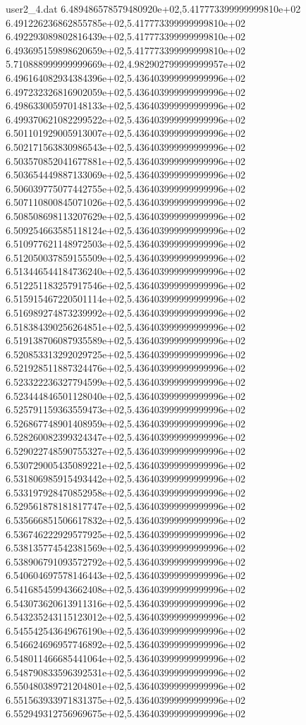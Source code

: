 \begin{filecontents}{user2_4.dat}
6.489486578579480920e+02,5.417773399999999810e+02
6.491226236862855785e+02,5.417773399999999810e+02
6.492293089802816439e+02,5.417773399999999810e+02
6.493695159898620659e+02,5.417773399999999810e+02
5.710888999999999669e+02,4.982902799999999957e+02
6.496164082934384396e+02,5.436403999999999996e+02
6.497232326816902059e+02,5.436403999999999996e+02
6.498633005970148133e+02,5.436403999999999996e+02
6.499370621082299522e+02,5.436403999999999996e+02
6.501101929005913007e+02,5.436403999999999996e+02
6.502171563830986543e+02,5.436403999999999996e+02
6.503570852041677881e+02,5.436403999999999996e+02
6.503654449887133069e+02,5.436403999999999996e+02
6.506039775077442755e+02,5.436403999999999996e+02
6.507110800845071026e+02,5.436403999999999996e+02
6.508508698113207629e+02,5.436403999999999996e+02
6.509254663585118124e+02,5.436403999999999996e+02
6.510977621148972503e+02,5.436403999999999996e+02
6.512050037859155509e+02,5.436403999999999996e+02
6.513446544184736240e+02,5.436403999999999996e+02
6.512251183257917546e+02,5.436403999999999996e+02
6.515915467220501114e+02,5.436403999999999996e+02
6.516989274873239992e+02,5.436403999999999996e+02
6.518384390256264851e+02,5.436403999999999996e+02
6.519138706087935589e+02,5.436403999999999996e+02
6.520853313292029725e+02,5.436403999999999996e+02
6.521928511887324476e+02,5.436403999999999996e+02
6.523322236327794599e+02,5.436403999999999996e+02
6.523444846501128040e+02,5.436403999999999996e+02
6.525791159363559473e+02,5.436403999999999996e+02
6.526867748901408959e+02,5.436403999999999996e+02
6.528260082399324347e+02,5.436403999999999996e+02
6.529022748590755327e+02,5.436403999999999996e+02
6.530729005435089221e+02,5.436403999999999996e+02
6.531806985915493442e+02,5.436403999999999996e+02
6.533197928470852958e+02,5.436403999999999996e+02
6.529561878181817747e+02,5.436403999999999996e+02
6.535666851506617832e+02,5.436403999999999996e+02
6.536746222929577925e+02,5.436403999999999996e+02
6.538135774542381569e+02,5.436403999999999996e+02
6.538906791093572792e+02,5.436403999999999996e+02
6.540604697578146443e+02,5.436403999999999996e+02
6.541685459943662408e+02,5.436403999999999996e+02
6.543073620613911316e+02,5.436403999999999996e+02
6.543235243115123012e+02,5.436403999999999996e+02
6.545542543649676190e+02,5.436403999999999996e+02
6.546624696957746892e+02,5.436403999999999996e+02
6.548011466685441064e+02,5.436403999999999996e+02
6.548790833596392531e+02,5.436403999999999996e+02
6.550480389721204801e+02,5.436403999999999996e+02
6.551563933971831375e+02,5.436403999999999996e+02
6.552949312756969675e+02,5.436403999999999996e+02

\end{filecontents}
